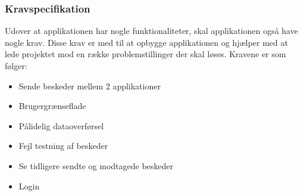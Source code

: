 \subsubsection{Kravspecifikation}
Udover at applikationen har nogle funktionaliteter, skal applikationen også have nogle krav. Disse krav er med til at opbygge applikationen og hjælper med at lede projektet mod en række problemstillinger der skal løses.
\newline
Kravene er som følger:
\begin{itemize}
	\item Sende beskeder mellem 2 applikationer
	
	\item Brugergrænseflade
	
	\item Pålidelig dataoverførsel
	
	\item Fejl testning af beskeder
	
	\item Se tidligere sendte og modtagede beskeder
	
	\item Login
\end{itemize}